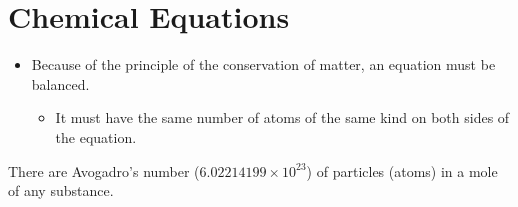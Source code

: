\documentclass{chem122notes}
\begin{document}
\section{Chemical Equations}\label{sec:chemical-equations}
\begin{itemize}
	\item Because of the principle of the conservation of matter, an equation must be balanced.
	\begin{itemize}
		\item It must have the same number of atoms of the same kind on both sides of the equation.
	\end{itemize}
\end{itemize}

There are Avogadro's number ($6.02214199\times10^{23}$) of particles (atoms) in a mole of any substance.
\end{document}
